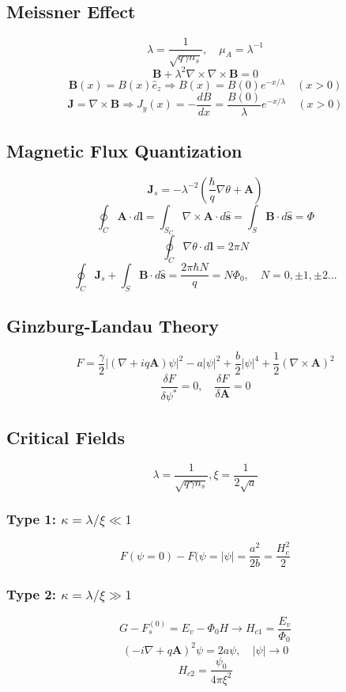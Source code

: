 \documentclass[12pt]{extarticle}
\newcommand{\parentheses}[1]{\ensuremath{\left( #1 \right)}}
\newcommand{\absolutevalue}[1]{\ensuremath{\left| #1 \right|}}
\begin{document}
\begin{multicols*}{2}
\subsection{Meissner Effect}
$$\lambda = \dfrac{1}{\sqrt{q\gamma n_s}}, \quad \mu_A = \lambda^{-1}$$
$$\mathbf{B} + \lambda^2 \nabla \times \nabla \times \mathbf{B} = 0$$
$$\mathbf{B}(x)=B(x) \hat{e}_z \Rightarrow B(x)=B(0) e^{-x/\lambda} \quad (x>0)$$
$$\mathbf{J}= \nabla \times \mathbf{B} \Rightarrow J_y(x)=-\dfrac{dB}{dx}=\dfrac{B(0)}{\lambda} e^{-x/\lambda} \quad (x>0)$$

\subsection{Magnetic Flux Quantization}
$$\mathbf{J}_s=-\lambda^{-2} \parentheses{\dfrac{\hbar}{q} \nabla \theta + \mathbf{A}}$$
$$\oint_C \mathbf{A} \cdot d \mathbf{l} = \int_{S_C} \nabla \times \mathbf{A} \cdot d \mathbf{\hat{s}} =  \int_{S} \mathbf{B} \cdot d \mathbf{\hat{s}} = \Phi$$
$$\oint_C \nabla \theta \cdot d\mathbf{l} = 2\pi N$$
$$\oint_C \mathbf{J}_s + \int_{S} \mathbf{B} \cdot d \mathbf{\hat{s}} = \dfrac{2 \pi \hbar N}{q}=N \Phi_0, \quad N=0,\pm 1, \pm 2...$$

\subsection{Ginzburg-Landau Theory}
$$F=\dfrac{\gamma}{2} \absolutevalue{\parentheses{\nabla + iq\mathbf{A}} \psi }^2 - a \absolutevalue{\psi}^2 + \dfrac{b}{2} \absolutevalue{\psi}^4 + \dfrac{1}{2} \parentheses{\nabla \times \mathbf{A}}^2$$
$$\dfrac{\delta F	}{\delta \psi^*}=0, \quad \dfrac{\delta F	}{\delta \mathbf{A}}=0$$

\subsection{Critical Fields}
$$\lambda = \dfrac{1}{\sqrt{q\gamma n_s}}, \xi =  \dfrac{1}{2\sqrt{a}}$$

\subsubsection{Type 1: $\kappa=\lambda/\xi \ll 1$}
$$F(\psi=0)-F(\psi=\absolutevalue{\psi} = \dfrac{a^2}{2b}= \dfrac{H_c^2}{2}$$

\subsubsection{Type 2: $\kappa=\lambda/\xi \gg 1$}
$$ G - F_{s}^{(0)} = E_v - \Phi_0 H \rightarrow H_{c1}=\dfrac{E_v}{\Phi_0}$$
$$\parentheses{-i \nabla + q\mathbf{A}}^2 \psi = 2a \psi, \quad \absolutevalue{\psi} \rightarrow 0$$
$$H_{c2}=\dfrac{\psi_0}{4 \pi \xi^ 2}$$


\end{multicols*}
\end{document}
